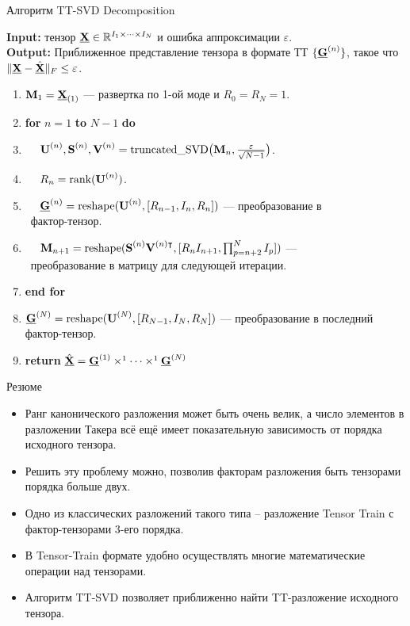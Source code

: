 \begin{frame}{Алгоритм TT-SVD Decomposition}

\textbf{Input:} тензор $\underline{\textbf{X}} \in \mathbb{R}^{I_1 \times \dots \times I_N}$ и ошибка аппроксимации $\varepsilon$.  \\
\textbf{Output:} Приближенное представление тензора в формате ТТ $\{ \underline{\textbf{G}}^{(n)} \}$, такое что $\lVert \underline{\textbf{X}} - \hat{\underline{\textbf{X}}} \rVert_F \leq \varepsilon$.

\begin{enumerate}
    \item $\textbf{M}_1 = \underline{\textbf{X}}_{(1)}$ --- развертка по 1-ой моде и $R_0 = R_N = 1$.
    \item \textbf{for} $n=1$ \textbf{to} $N-1$ \textbf{do}
    \item $\quad$ $\textbf{U}^{(n)}, \textbf{S}^{(n)}, \textbf{V}^{(n)} = \text{truncated\_SVD} \big(\textbf{M}_{n}, \frac{\varepsilon}{\sqrt{N-1}}\big)$.
    \item $\quad$ $R_n = \text{rank}(\textbf{U}^{(n)})$.
    \item $\quad$ $\underline{\textbf{G}}^{(n)} = \text{reshape}(\textbf{U}^{(n)}, [ R_{n-1}, I_n, R_n])$ --- преобразование в \\ \quad \ фактор-тензор.
    \item $\quad$ $\textbf{M}_{n+1} = \text{reshape}(\textbf{S}^{(n)}\textbf{V}^{(n)\intercal}, [ R_n I_{n+1}, \prod_{p=n+2}^{N} I_p])$ --- \\ \quad \ преобразование в матрицу для следующей итерации.
    
    \item \textbf{end for}
    \item $\underline{\textbf{G}}^{(N)} = \text{reshape}(\textbf{U}^{(N)}, [ R_{N-1}, I_N, R_N])$ --- преобразование в последний фактор-тензор.
    \item \textbf{return} $ \hat{\underline{\textbf{X}}} = \underline{\textbf{G}}^{(1)} \times^1 \dots \times^1 \underline{\textbf{G}}^{(N)}$
\end{enumerate}

\end{frame}

\begin{frame}{Резюме}
\begin{itemize}
    \item Ранг канонического разложения может быть очень велик, а число элементов в разложении Такера всё ещё имеет показательную зависимость от порядка исходного тензора.
    \item Решить эту проблему можно, позволив факторам разложения быть тензорами порядка больше двух.
    \item Одно из классических разложений такого типа -- разложение Tensor Train с фактор-тензорами 3-его порядка.
    \item В Tensor-Train формате удобно осуществлять многие математические операции над тензорами.
    \item Алгоритм TT-SVD позволяет приближенно найти TT-разложение исходного тензора.
\end{itemize}
\end{frame}
 